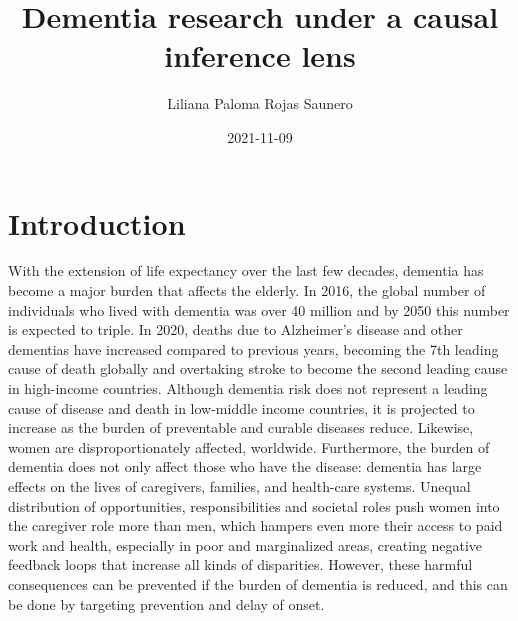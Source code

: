 \documentclass[
]{book}
\title{Dementia research under a causal inference lens}
\author{Liliana Paloma Rojas Saunero}
\date{2021-11-09}
\begin{document}
\maketitle

{
\setcounter{tocdepth}{1}
\tableofcontents
}
\hypertarget{intro}{%
\chapter{Introduction}\label{intro}}

With the extension of life expectancy over the last few decades, dementia has become a major burden that affects the elderly. In 2016, the global number of individuals who lived with dementia was over 40 million\autocite{gbd2016} and by 2050 this number is expected to triple\autocite{worldreport2018}. In 2020, deaths due to Alzheimer's disease and other dementias have increased compared to previous years, becoming the 7th leading cause of death globally and overtaking stroke to become the second leading cause in high-income countries. Although dementia risk does not represent a leading cause of disease and death in low-middle income countries, it is projected to increase as the burden of preventable and curable diseases reduce\autocite{who2020}. Likewise, women are disproportionately affected, worldwide\autocite{women2015}. Furthermore, the burden of dementia does not only affect those who have the disease: dementia has large effects on the lives of caregivers, families, and health-care systems. Unequal distribution of opportunities, responsibilities and societal roles push women into the caregiver role more than men, which hampers even more their access to paid work and health, especially in poor and marginalized areas, creating negative feedback loops that increase all kinds of disparities\autocite{swinkels2019,brodaty2009,etters2008}. However, these harmful consequences can be prevented if the burden of dementia is reduced, and this can be done by targeting prevention and delay of onset\autocite{carrillo2013}.
\end{document}
